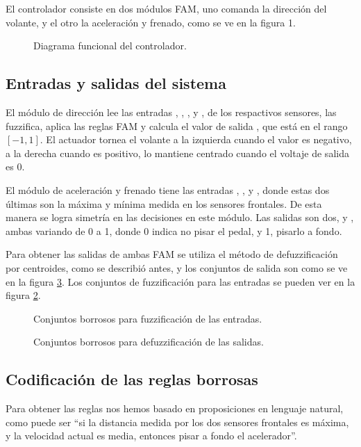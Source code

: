 \documentclass[conference,spanish,a4paper,10pt,oneside,final]{tfmpd}
\begin{document}
El controlador consiste en dos módulos FAM, uno  comanda la dirección
del volante, y el otro la aceleración y frenado, como se ve en la figura 1.
%
\begin{figure}[tbhp]
\caption{Diagrama funcional del controlador.}
\label{fig1}
\end{figure}
%
\subsection{Entradas y salidas del sistema}
El módulo de dirección lee las entradas
, ,
, y ,
de los respactivos sensores, las fuzzifica, aplica las reglas FAM y
calcula el valor de salida , que está en el rango
$[-1,1]$. El actuador tornea el volante a la izquierda cuando el valor
es negativo, a la derecha cuando es positivo, lo mantiene centrado cuando
el voltaje de salida es 0.

El módulo de aceleración y frenado tiene las entradas ,
, y , donde
estas dos últimas son la máxima y mínima medida en los sensores frontales. De
esta manera se logra simetría en las decisiones en este módulo. Las salidas
son dos,  y , ambas variando de 0 a 1, donde 0
indica no pisar el pedal, y 1, pisarlo a fondo.

Para obtener las salidas de ambas FAM se utiliza el método de defuzzificación
por centroides, como se describió antes, y los conjuntos de salida son como
se ve en la figura \ref{fig3}. Los conjuntos de fuzzificación para las 
entradas se pueden ver en la figura \ref{fig2}. 
%
\begin{figure}[tbhp]
\caption{Conjuntos borrosos para fuzzificación de las entradas.}
\label{fig2}
\end{figure}
%
\begin{figure}[tbhp]
\caption{Conjuntos borrosos para defuzzificación de las salidas.}
\label{fig3}
\end{figure}
%
\subsection{Codificación de las reglas borrosas}
Para obtener las reglas nos hemos basado en proposiciones en lenguaje natural,
como puede ser ``si la distancia medida por los dos sensores frontales es máxima, y
la velocidad actual es media, entonces pisar a fondo el acelerador''. 
\end{document}
